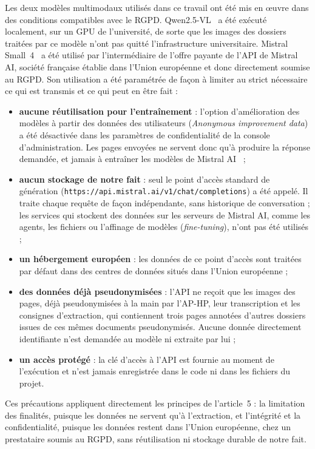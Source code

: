 Les deux modèles multimodaux utilisés dans ce travail ont été mis en œuvre dans des conditions compatibles avec le RGPD. Qwen2.5-VL~\cite{bai2025qwen25vl} a été exécuté localement, sur un GPU de l'université, de sorte que les images des dossiers traitées par ce modèle n'ont pas quitté l'infrastructure universitaire. Mistral Small~4~\cite{mistralsmall4} a été utilisé par l'intermédiaire de l'offre payante de l'API de Mistral AI, société française établie dans l'Union européenne et donc directement soumise au RGPD. Son utilisation a été paramétrée de façon à limiter au strict nécessaire ce qui est transmis et ce qui peut en être fait :
\begin{itemize}
  \item \textbf{aucune réutilisation pour l'entraînement} : l'option d'amélioration des modèles à partir des données des utilisateurs (\emph{Anonymous improvement data}) a été désactivée dans les paramètres de confidentialité de la console d'administration. Les pages envoyées ne servent donc qu'à produire la réponse demandée, et jamais à entraîner les modèles de Mistral AI~\cite{mistral_retention} ;
  \item \textbf{aucun stockage de notre fait} : seul le point d'accès standard de génération (\texttt{https://api.mistral.ai/v1/chat/completions}) a été appelé. Il traite chaque requête de façon indépendante, sans historique de conversation ; les services qui stockent des données sur les serveurs de Mistral AI, comme les agents, les fichiers ou l'affinage de modèles (\emph{fine-tuning}), n'ont pas été utilisés ;
  \item \textbf{un hébergement européen} : les données de ce point d'accès sont traitées par défaut dans des centres de données situés dans l'Union européenne ;
  \item \textbf{des données déjà pseudonymisées} : l'API ne reçoit que les images des pages, déjà pseudonymisées à la main par l'AP-HP, leur transcription et les consignes d'extraction, qui contiennent trois pages annotées d'autres dossiers issues de ces mêmes documents pseudonymisés. Aucune donnée directement identifiante n'est demandée au modèle ni extraite par lui ;
  \item \textbf{un accès protégé} : la clé d'accès à l'API est fournie au moment de l'exécution et n'est jamais enregistrée dans le code ni dans les fichiers du projet.
\end{itemize}
Ces précautions appliquent directement les principes de l'article~5 : la limitation des finalités, puisque les données ne servent qu'à l'extraction, et l'intégrité et la confidentialité, puisque les données restent dans l'Union européenne, chez un prestataire soumis au RGPD, sans réutilisation ni stockage durable de notre fait.

